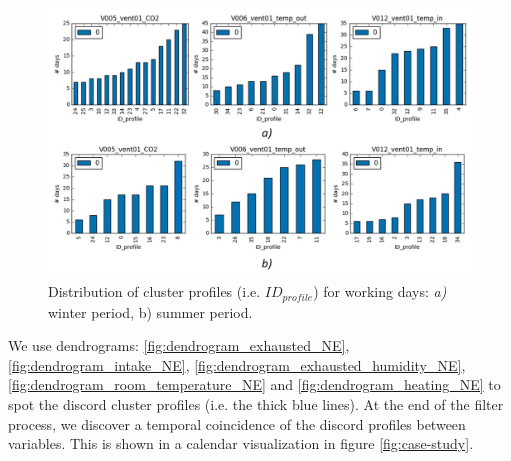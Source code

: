 \begin{figure}[h!]
  \vspace{0.5em} %
  \includegraphics[scale=0.7]{Figures/cluster_dist_winter_summer.jpg}
  \caption{Distribution of cluster profiles (i.e. $ID_{profile}$) for working days: \textit{a)} winter period, b) summer period.}
  \label{fig:winter_vs_summer}
\end{figure} 

We use dendrograms: \ref{fig:dendrogram_exhausted_NE}, \ref{fig:dendrogram_intake_NE}, \ref{fig:dendrogram_exhausted_humidity_NE}, \ref{fig:dendrogram_room_temperature_NE} and \ref{fig:dendrogram_heating_NE} to spot the discord cluster profiles (i.e. the thick blue lines). At the end of the filter process, we discover a temporal coincidence of the discord profiles between variables. This is shown in a calendar visualization in figure \ref{fig:case-study}. 

